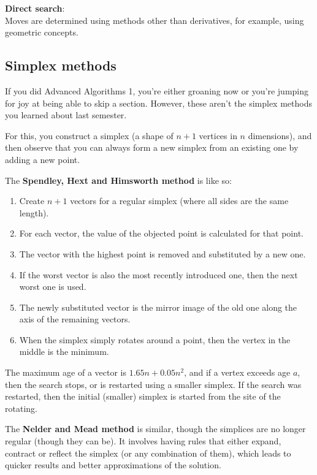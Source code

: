 \begin{description}
  \item \textbf{Direct search}:\\
    Moves are determined using methods other than derivatives, for example,
    using geometric concepts.

    \subsection{Simplex methods}

    If you did Advanced Algorithms 1, you're either groaning now or you're
    jumping for joy at being able to skip a section. However, these aren't the
    simplex methods you learned about last semester.

    For this, you construct a simplex (a shape of $n+1$ vertices in $n$
    dimensions), and then observe that you can always form a new simplex from an
    existing one by adding a new point.

    The \textbf{Spendley, Hext and Himsworth method} is like so:

    \begin{enumerate}
      \item Create $n+1$ vectors for a regular simplex (where all sides are the
      same length).
      \item For each vector, the value of the objected point is calculated for
      that point.
      \item The vector with the highest point is removed and substituted by a 
      new one.
      \item If the worst vector is also the most recently introduced one, then
      the next worst one is used.
      \item The newly substituted vector is the mirror image of the old one
      along the axis of the remaining vectors. %
      \item When the simplex simply rotates around a point, then
      the vertex in the middle is the minimum.
    \end{enumerate}

    The maximum age of a vector is $1.65n + 0.05 n^2$, and if a vertex exceeds
    age $a$, then the search stops, or is restarted using a smaller simplex.
    If the search was restarted, then the initial (smaller) simplex is started
    from the site of the rotating.

    The \textbf{Nelder and Mead method} is similar, though the simplices are no
    longer regular (though they can be). It involves having rules that either
    expand, contract or reflect the simplex (or any combination of them), which
    leads to quicker results and better approximations of the solution.


\end{description}
